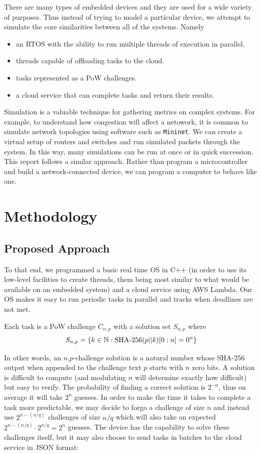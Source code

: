 \documentclass[twoside,twocolumn]{article}
\newcommand{\newp}{\newline\indent}
\begin{document}
There are many types of embedded devices and they are used for a wide variety of purposes.
Thus instead of trying to model a particular device, we attempt to simulate the core similarities between all of the systems.
Namely
\begin{itemize}
  \item an RTOS with the ability to run multiple threads of execution in parallel.
  \item threads capable of offloading tasks to the cloud.
  \item tasks represented as a PoW challenges.
  \item a cloud service that can complete tasks and return their results.
\end{itemize}

Simulation is a valuable technique for gathering metrics on complex systems.
For example, to understand how congestion will affect a netowork, it is common to simulate network topologies using software such as \texttt{Mininet}.
We can create a virtual setup of routers and switches and run simulated packets through the system.
In this way, many simulations can be run at once or in quick succession.
\newp This report follows a similar approach.
Rather than program a microcontroller and build a network-connected device, we can program a computer to behave like one.


\section{Methodology}

\subsection{Proposed Approach}
To that end, we programmed a basic real time OS in C++ (in order to use its low-level facilities to create threads, them being most similar to what would be available on an embedded system) and a cloud service using AWS Lambda.
Our OS makes it easy to run periodic tasks in parallel and tracks when deadlines are not met.

Each task is a PoW challenge $C_{n,p}$ with a solution set $S_{n,p}$ where
\[
  S_{n,p} = \{ k \in \mathbb{N} : \textnormal{SHA-256}(p || k)[0:n] = 0^n \}
\]

In other words, an $n$,$p$-challenge solution is a natural number whose SHA-256 output when appended to the challenge text $p$ starts with $n$ zero bits.
A solution is difficult to compute (and modulating $n$ will determine exactly how difficult) but easy to verify.
\newp The probability of finding a correct solution is $2^{-n}$, thus on average it will take $2^n$ guesses.
In order to make the time it takes to complete a task more predictable, we may decide to forgo a challenge of size $n$ and instead use $2^{n-(n/q)}$ challenges of size $n/q$ which will also take an expected $2^{n-(n/q)} \cdot 2^{n/q} = 2^n$ guesses.
\newp The device has the capability to solve these challenges itself, but it may also choose to send tasks in batches to the cloud service in JSON format:
\end{document}

